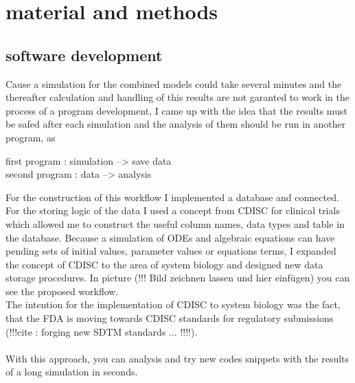 \section{material and methods}
\subsection{software development}
Cause a simulation for the combined models could take several minutes and the thereafter calculation and handling of this results are not garanted to work in the process of a program development, I came up with the idea that the results must be safed after each simulation and the analysis of them should be run in another program, as \\
\begin{center}
	first program : simulation --> save data\\
	second program : data --> analysis
\end{center}
For the construction of this workflow I implemented a database and connected. For the storing logic of the data I used a concept from CDISC for clinical trials which allowed me to construct the useful column names, data types and table in the database. Because a simulation of ODEs and algebraic equations can have pending sets of initial values, parameter values or equations terms, I expanded the concept of CDISC to the area of system biology and designed new data storage procedures. In picture (!!! Bild zeichnen lassen und hier einfügen) you can see  the proposed workflow. \\ The intention for the  implementation of CDISC to system biology was the fact, that the FDA is moving towards CDISC standards for regulatory submissions (!!!cite : forging new SDTM standards ... !!!!).\\\\
With this approach, you can analysis and try new codes snippets with the results of a long simulation in seconds. \\